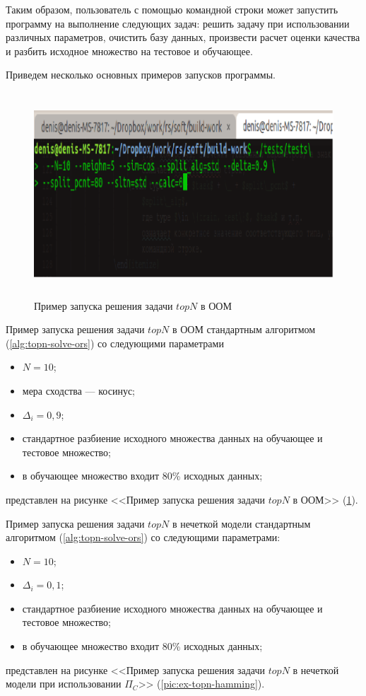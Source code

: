 Таким образом, пользователь с помощью командной строки
может запустить программу на выполнение следующих задач:
решить задачу при использовании различных параметров,
очистить базу данных, произвести расчет
оценки качества и разбить исходное множество на тестовое и обучающее.

Приведем несколько основных примеров запусков программы.

\begin{figure}[H]
	\caption{Пример запуска решения задачи $topN$ в ООМ}
	\label{pic:ex-topn-cos}
	\begin{center}
  \includegraphics[width=7in,height=3in]{pics/examples/topn-cos.png}
\end{center}
\end{figure}

Пример запуска решения задачи $topN$ в ООМ стандартным
алгоритмом (\ref{alg:topn-solve-ors}) со следующими параметрами
\begin{itemize}
	\item $N=10$;
	\item мера сходства --- косинус;
	\item $\Delta_i = 0,9$;
	\item стандартное разбиение исходного множества данных на обучающее и
		тестовое множество;
	\item в обучающее множество входит 80\% исходных данных;
\end{itemize}
представлен на рисунке <<Пример запуска решения задачи $topN$ в ООМ>> (\ref{pic:ex-topn-cos}).

Пример запуска решения задачи $topN$ в нечеткой модели стандартным
алгоритмом (\ref{alg:topn-solve-ors}) со следующими параметрами:
\begin{itemize}
	\item $N=10$;
	\item $\Delta_i = 0,1$;
	\item стандартное разбиение исходного множества данных на обучающее и
		тестовое множество;
	\item в обучающее множество входит 80\% исходных данных;
\end{itemize}
представлен на рисунке <<Пример запуска решения задачи $topN$ в нечеткой модели при
	использовании $\Pi_C$>> (\ref{pic:ex-topn-hamming}).

